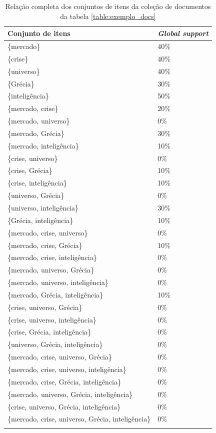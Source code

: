 \documentclass[a4paper,12pt]{article}
\begin{document}
\begin{longtable}{ | l | l | }
\hline
Conjunto de itens & \textit{Global support} \\ \hline
\{mercado\}				& 40\% \\ \hline
\{crise\}				& 40\% \\ \hline
\{universo\}				& 40\% \\ \hline
\{Grécia\}				& 30\% \\ \hline
\{inteligência\}			& 50\% \\ \hline
\{mercado, crise\}			& 20\% \\ \hline
\{mercado, universo\}		& 0\% \\ \hline
\{mercado, Grécia\}		& 30\% \\ \hline
\{mercado, inteligência\}		& 10\% \\ \hline
\{crise, universo\}			& 0\% \\ \hline
\{crise, Grécia\}			& 10\% \\ \hline
\{crise, inteligência\}		& 10\% \\ \hline
\{universo, Grécia\}		& 0\% \\ \hline
\{universo, inteligência\}		& 30\% \\ \hline
\{Grécia, inteligência\}		& 10\% \\ \hline
\{mercado, crise, universo\}		& 0\% \\ \hline
\{mercado, crise, Grécia\}			& 10\% \\ \hline
\{mercado, crise, inteligência\}		& 0\% \\ \hline
\{mercado, universo, Grécia\}		& 0\% \\ \hline
\{mercado, universo, inteligência\}	& 0\% \\ \hline
\{mercado, Grécia, inteligência\}		& 10\% \\ \hline
\{crise, universo, Grécia\}			& 0\% \\ \hline
\{crise, universo, inteligência\}		& 0\% \\ \hline
\{crise, Grécia, inteligência\}		& 0\% \\ \hline
\{universo, Grécia, inteligência\}		& 0\% \\ \hline
\{mercado, crise, universo, Grécia\}			& 0\% \\ \hline
\{mercado, crise, universo, inteligência\}		& 0\% \\ \hline
\{mercado, crise, Grécia, inteligência\}			& 0\% \\ \hline
\{mercado, universo, Grécia, inteligência\}		& 0\% \\ \hline
\{crise, universo, Grécia, inteligência\}			& 0\% \\ \hline
\{mercado, crise, universo, Grécia, inteligência\}	& 0\% \\
\hline
\caption{Relação completa dos conjuntos de itens da coleção de documentos da tabela \ref{table:exemplo_docs}}
\label{table:colecao_completa_conjutos_itens_frequentes}
\end{longtable}
\end{document}
